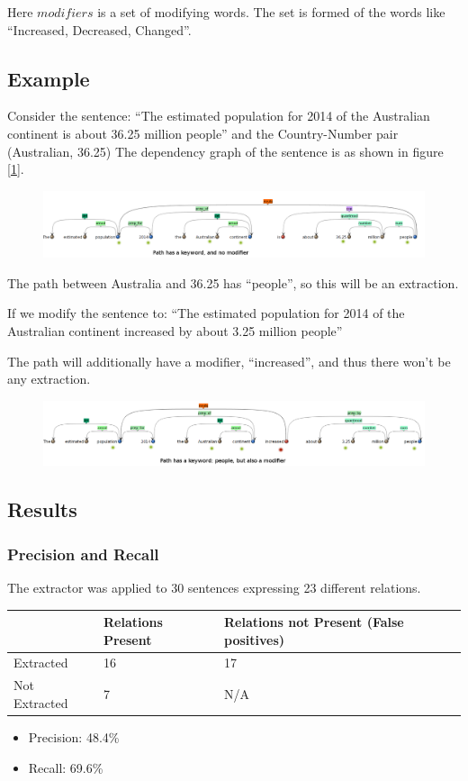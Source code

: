 \documentclass[a4paper,10pt]{article}
\begin{document}
Here $modifiers$ is a set of modifying words. The set is formed of the words like {``Increased, Decreased, 
Changed''}.

\subsection{Example}
Consider the sentence:
``The estimated population for 2014 of the Australian continent	is about 36.25 million people''
and the Country-Number pair (Australian, 36.25)
The dependency graph of the sentence is as shown in figure [\ref{pos}].
\begin{figure}[H]
 \centering
 \includegraphics[bb=0 0 1292 228,scale=0.3]{./dep_pos.png}
 \label{pos}
\end{figure}
The path between Australia and 36.25 has ``people'', so this will be an extraction.

If we modify the sentence to:
``The estimated population for 2014 of the Australian continent	increased by about 3.25 million people''

The path will additionally have a modifier, ``increased'', and thus there won't be any extraction.
\begin{figure}[H]
 \centering
 \includegraphics[bb=0 0 1292 228,scale=0.3]{./dep_neg.png}
 \label{neg}
\end{figure}




\subsection{Results}
\subsubsection{Precision and Recall}
The extractor was applied to 30 sentences expressing 23 different relations.
\begin{tabular}{|l|l|l|}
\hline
& Relations Present & Relations not Present (False positives) \\
\hline
Extracted & 16 & 17 \\
\hline
Not Extracted & 7 & N/A \\
\hline
\end{tabular}
 \begin{itemize}
  \item Precision: 48.4\%
  \item Recall: 69.6\%
 \end{itemize}
\end{document}
